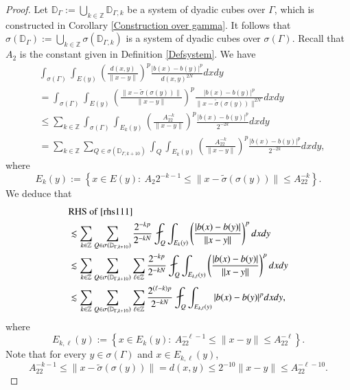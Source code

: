 \documentclass[12pt]{amsart}
\begin{document}
\begin{proof}
Let ${\mathbb{D}_{\Gamma}:=\bigcup_{k\in\mathbb{Z}}\mathbb{D}_{\Gamma,k}}$ be a system of dyadic cubes over $\Gamma$, which is constructed in Corollary \ref{Construction over gamma}. It follows that ${ \sigma(\mathbb{D}_{\Gamma}):=\bigcup_{k\in\mathbb{Z}}\sigma(\mathbb{D}_{\Gamma,k})}$ is a system of dyadic cubes over $\sigma(\Gamma)$. Recall that $A_2$ is the constant given in Definition \ref{Defsystem}. We have
\begin{align}\label{rhs111}
&\int_{\sigma(\Gamma)}\int_{E(y)}\left(\frac{d(x,y)}{\|x-y\|}\right)^p\frac{|b(x)-b(y)|^p}{d(x,y)^{2N}}dxdy\nonumber\\
&=\int_{\sigma(\Gamma)}\int_{E(y)}\left(\frac{\|x-\widetilde{\sigma}(\sigma(y))\|}{\|x-y\|}\right)^p\frac{|b(x)-b(y)|^p}{\|x-\widetilde{\sigma}(\sigma(y))\|^{2N}}dxdy\nonumber\\
&\leq \sum_{k\in\mathbb{Z}}\int_{\sigma(\Gamma)}\int_{E_k(y)}\left(\frac{A_22^{-k}}{\|x-y\|}\right)^p\frac{|b(x)-b(y)|^p}{2^{-2k}}dxdy\nonumber\\
&=\sum_{k\in\mathbb{Z}}\sum_{Q\in\sigma(\mathbb{D}_{\Gamma,k+10})}\int_{Q}\int_{E_k(y)}\left(\frac{A_22^{-k}}{\|x-y\|}\right)^p\frac{|b(x)-b(y)|^p}{2^{-2k}}dxdy,
\end{align}
where
$$E_k(y):=\left\{x\in E(y):\ A_2 2^{-k-1}\leq \|x-\widetilde{\sigma}(\sigma(y))\|\leq A_22^{-k}\right\}.$$
We deduce that
\begin{align}\label{rhs333}
  &{\rm RHS}\ {\rm of}\ \eqref{rhs111}\nonumber\\
  &\lesssim\sum_{k\in\mathbb{Z}}\sum_{Q\in\sigma(\mathbb{D}_{\Gamma,k+10})}\frac{2^{-kp}}{2^{-kN}}\fint_{Q}\int_{E_k(y)}\left(\frac{|b(x)-b(y)|}{\|x-y\|}\right)^pdxdy\nonumber\\
    &\lesssim \sum_{k\in\mathbb{Z}}\sum_{Q\in\sigma(\mathbb{D}_{\Gamma,k+10})}\sum_{\ell\in\mathbb{Z}}\frac{2^{-kp}}{2^{-kN}}\fint_{Q}\int_{E_{k,\ell}(y)}\left(\frac{|b(x)-b(y)|}{\|x-y\|}\right)^pdxdy\nonumber\\
    &\lesssim \sum_{k\in\mathbb{Z}}\sum_{Q\in\sigma(\mathbb{D}_{\Gamma,k+10})}\sum_{\ell\in\mathbb{Z}}\frac{2^{(\ell-k)p}}{2^{-kN}}\fint_{Q}\int_{E_{k,\ell}(y)}|b(x)-b(y)|^pdxdy,
\end{align}
where $$E_{k,\ell}(y):=\left\{x\in E_k(y):\ A_22^{-\ell-1}\leq \|x-y\|\leq A_22^{-\ell}\right\}.$$
Note that for every $y\in \sigma(\Gamma)$ and $x\in E_{k,\ell}(y)$,
$$A_22^{-k-1}\leq \|x-\widetilde{\sigma}(\sigma(y))\|=d(x,y)\leq 2^{-10}\|x-y\|\leq A_22^{-\ell-10}.$$

\end{proof}
\end{document}
